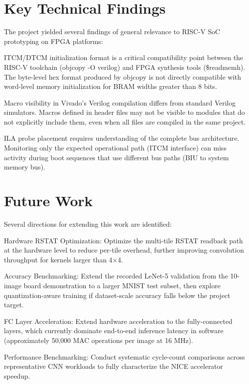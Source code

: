 \section{Key Technical Findings}\label{sec:6_2}

The project yielded several findings of general relevance to RISC-V SoC prototyping on FPGA platforms:


ITCM/DTCM initialization format is a critical compatibility point between the RISC-V toolchain (objcopy -O verilog) and FPGA synthesis tools (\$readmemh). The byte-level hex format produced by objcopy is not directly compatible with word-level memory initialization for BRAM widths greater than 8 bits.


Macro visibility in Vivado's Verilog compilation differs from standard Verilog simulators. Macros defined in header files may not be visible to modules that do not explicitly include them, even when all files are compiled in the same project.


ILA probe placement requires understanding of the complete bus architecture. Monitoring only the expected operational path (ITCM interface) can miss activity during boot sequences that use different bus paths (BIU to system memory bus).


\section{Future Work}\label{sec:6_3}

Several directions for extending this work are identified:


Hardware RSTAT Optimization: Optimize the multi-tile RSTAT readback path at the hardware level to reduce per-tile overhead, further improving convolution throughput for kernels larger than 4$\times$4.


Accuracy Benchmarking: Extend the recorded LeNet-5 validation from the 10-image board demonstration to a larger MNIST test subset, then explore quantization-aware training if dataset-scale accuracy falls below the project target.


FC Layer Acceleration: Extend hardware acceleration to the fully-connected layers, which currently dominate end-to-end inference latency in software (approximately 50,000 MAC operations per image at 16 MHz).


Performance Benchmarking: Conduct systematic cycle-count comparisons across representative CNN workloads to fully characterize the NICE accelerator speedup.


